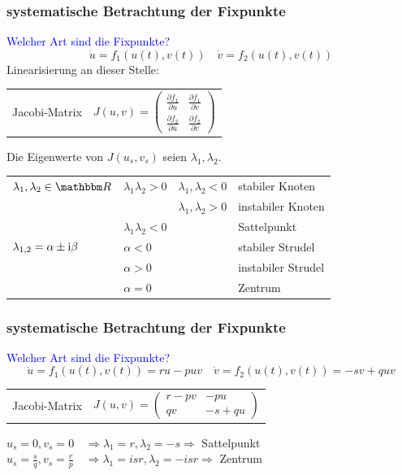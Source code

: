 \documentclass{beamer}
\begin{document}
\frame
{
  \frametitle{systematische Betrachtung der Fixpunkte}
  \textcolor{blue} {Welcher Art sind die Fixpunkte?}
\begin{equation}
 \dot u = f_1(u(t),v(t))\quad \dot v = f_2(u(t),v(t)) \nonumber
\end{equation}
 Linearisierung an dieser Stelle:
\begin{flushright}
\begin{tabular}{ll}
Jacobi-Matrix  & $J(u,v)=\begin{pmatrix} \frac{\partial f_1}{\partial u} & \frac{\partial f_1}{\partial v} \\ \frac{\partial f_2}{\partial u} & \frac{\partial f_2}{\partial v} \end{pmatrix}$
\end{tabular}
\end{flushright}
Die Eigenwerte von $J(u_s,v_s)$ seien $\lambda_{1},\lambda_{2}$.
\begin{tabular}{|l|ll|l|}\hline
$\lambda_{1},\lambda_{2} \in \mathbbm R$& $\lambda_{1}\lambda_{2}>0$ & $\lambda_{1},\lambda_{2} <0$& stabiler Knoten\\
& & $\lambda_{1},\lambda_{2} >0$& instabiler Knoten\\
& $\lambda_{1}\lambda_{2}<0$ & & Sattelpunkt\\\hline
$\lambda_{1,2} = \alpha \pm {\rm i} \beta$ & $\alpha<0$ & &stabiler Strudel\\
& $\alpha>0$ & & instabiler Strudel\\
& $\alpha=0$ & & Zentrum\\ \hline
\end{tabular}
}

\frame
{
  \frametitle{systematische Betrachtung der Fixpunkte}
  \textcolor{blue} {Welcher Art sind die Fixpunkte?}
\begin{equation}
 \dot u = f_1(u(t),v(t))=r u - p u v\quad \dot v = f_2(u(t),v(t))=- s v + q u v \nonumber
\end{equation}\newline\newline
\begin{tabular}{ll}
Jacobi-Matrix  & $J(u,v)=\begin{pmatrix} r -p v & - p u \\ q v & - s + q u \end{pmatrix}$
\end{tabular}\newline\newline\newline
$u_s= 0, v_s=0 \quad \Rightarrow \lambda_{1}=r,\lambda_{2}=-s \Rightarrow$ Sattelpunkt\newline\newline
$u_s= \frac{s}{q},v_s=\frac{r}{p} \quad \Rightarrow \lambda_{1}=i s r, \lambda_{2}=-i s r \Rightarrow$ Zentrum
}
\end{document}
